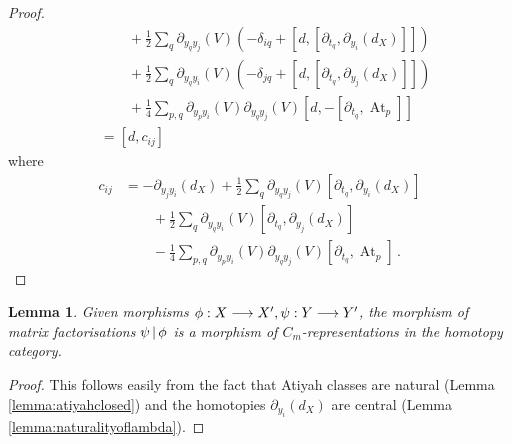\documentclass[english,letter paper,12pt,leqno]{article}
\newtheorem{lemma}[theorem]{Lemma}
\theoremstyle{example}
\numberwithin{equation}{section}
\DeclareMathOperator{\At}{At}
\begin{document}
\begin{proof}
\begin{align*}
&\qquad + \frac{1}{2}\sum_q \partial_{y_qy_j}(V) \left( -\delta_{iq} + [d, [ \partial_{t_q}, \partial_{y_i}(d_X)]] \right)\\
&\qquad + \frac{1}{2} \sum_q \partial_{y_qy_i}(V) \left( -\delta_{jq} + [d, [\partial_{t_q}, \partial_{y_j}(d_X)]] \right)\\
&\qquad + \frac{1}{4}\sum_{p,q} \partial_{y_py_i}(V) \partial_{y_qy_j}(V) [d, -[\partial_{t_q}, \At_p]]\\
&= [d, c_{ij}]
\end{align*}
where
\begin{align*}
c_{ij} &= - \partial_{y_jy_i}(d_X) + \frac{1}{2} \sum_q \partial_{y_qy_j}(V)  [\partial_{t_q}, \partial_{y_i}(d_X)]\\
&\qquad + \frac{1}{2} \sum_q \partial_{y_qy_i}(V) [\partial_{t_q}, \partial_{y_j}(d_X)]\\
&\qquad - \frac{1}{4} \sum_{p,q}  \partial_{y_py_i}(V) \partial_{y_qy_j}(V)  [\partial_{t_q}, \At_p]\,.
\end{align*}
\end{proof}

\begin{lemma}\label{prop:morphismsarecliffordreps} Given morphisms $\phi: X \longrightarrow X', \psi: Y \longrightarrow Y'$, the morphism of matrix factorisations $\psi \,|\, \phi$ is a morphism of $C_m$-representations in the homotopy category.
\end{lemma}
\begin{proof}
This follows easily from the fact that Atiyah classes are natural (Lemma \ref{lemma:atiyahclosed}) and the homotopies $\partial_{y_i}(d_X)$ are central (Lemma \ref{lemma:naturalityoflambda}).
\end{proof}
\end{document}
